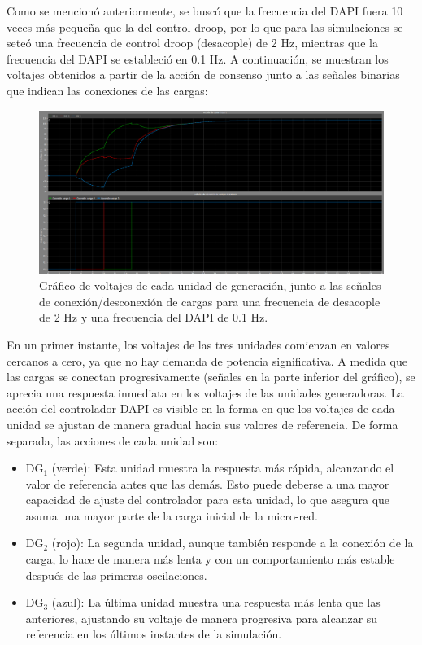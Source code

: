 Como se mencionó anteriormente, se buscó que la frecuencia del DAPI fuera 10 veces más pequeña que la del control droop, por lo que para las simulaciones se seteó una frecuencia de control droop (desacople) de 2 Hz, mientras que la frecuencia del DAPI se estableció en 0.1 Hz. A continuación, se muestran los voltajes obtenidos a partir de la acción de consenso junto a las señales binarias que indican las conexiones de las cargas:

\begin{figure}
    \centering
    \includegraphics[width=1.0\linewidth]{Tarea 2/report/imagenes/p2a/accion_dapi_ok.png}
    \caption{Gráfico de voltajes de cada unidad de generación, junto a las señales de conexión/desconexión de cargas para una frecuencia de desacople de 2 Hz y una frecuencia del DAPI de 0.1 Hz.}
    \label{accion_dapi_ok}
\end{figure}

En un primer instante, los voltajes de las tres unidades comienzan en valores cercanos a cero, ya que no hay demanda de potencia significativa. A medida que las cargas se conectan progresivamente (señales en la parte inferior del gráfico), se aprecia una respuesta inmediata en los voltajes de las unidades generadoras. La acción del controlador DAPI es visible en la forma en que los voltajes de cada unidad se ajustan de manera gradual hacia sus valores de referencia. De forma separada, las acciones de cada unidad son:
\begin{itemize}
    \item DG$_1$ (verde): Esta unidad muestra la respuesta más rápida, alcanzando el valor de referencia antes que las demás. Esto puede deberse a una mayor capacidad de ajuste del controlador para esta unidad, lo que asegura que asuma una mayor parte de la carga inicial de la micro-red.
    \item DG$_2$ (rojo): La segunda unidad, aunque también responde a la conexión de la carga, lo hace de manera más lenta y con un comportamiento más estable después de las primeras oscilaciones.
    \item DG$_3$ (azul): La última unidad muestra una respuesta más lenta que las anteriores, ajustando su voltaje de manera progresiva para alcanzar su referencia en los últimos instantes de la simulación.
\end{itemize}

